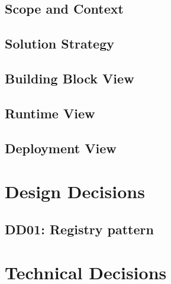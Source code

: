 \subsection{Scope and Context}

\subsection{Solution Strategy}

\subsection{Building Block View}

\subsection{Runtime View}

\subsection{Deployment View}


\section{Design Decisions}

\subsection{DD01: Registry pattern}


\section{Technical Decisions}

